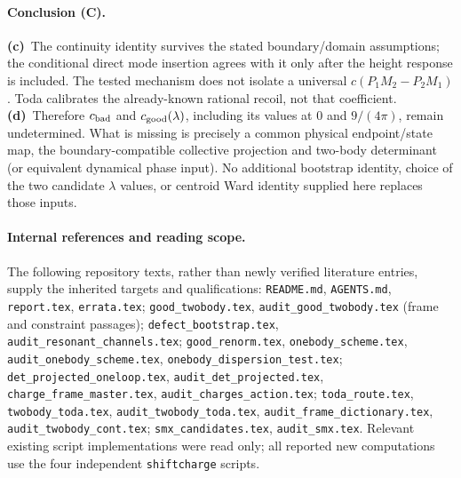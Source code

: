\documentclass[11pt,a4paper]{article}
\newcommand{\C}{\textbf{(c)}\ }
\newcommand{\D}{\textbf{(d)}\ }
\newcommand{\file}[1]{\nolinkurl{#1}}
\begin{document}
\paragraph{Conclusion (C).}
\C The continuity identity survives the stated boundary/domain assumptions;
the conditional direct mode insertion agrees with it only after the height
response is included. The tested mechanism does not isolate a universal
$c(P_1M_2-P_2M_1)$. Toda calibrates the already-known rational recoil,
not that coefficient. \D Therefore $c_{\rm bad}$ and
$c_{\rm good}(\lambda)$, including its values at $0$ and $9/(4\pi)$,
remain undetermined. What is missing is precisely a common physical
endpoint/state map, the boundary-compatible collective projection and
two-body determinant (or equivalent dynamical phase input). No additional
bootstrap identity, choice of the two candidate $\lambda$ values, or
centroid Ward identity supplied here replaces those inputs.

\paragraph{Internal references and reading scope.}
{\raggedright
The following repository texts, rather than newly verified literature
entries, supply the inherited targets and qualifications:
\file{README.md}, \file{AGENTS.md}, \file{report.tex}, \file{errata.tex};
\file{good_twobody.tex}, \file{audit_good_twobody.tex} (frame and constraint
passages); \file{defect_bootstrap.tex}, \file{audit_resonant_channels.tex};
\file{good_renorm.tex}, \file{onebody_scheme.tex},
\file{audit_onebody_scheme.tex}, \file{onebody_dispersion_test.tex};
\file{det_projected_oneloop.tex}, \file{audit_det_projected.tex},
\file{charge_frame_master.tex}, \file{audit_charges_action.tex};
\file{toda_route.tex}, \file{twobody_toda.tex},
\file{audit_twobody_toda.tex}, \file{audit_frame_dictionary.tex},
\file{audit_twobody_cont.tex}; \file{smx_candidates.tex}, \file{audit_smx.tex}.
Relevant existing script implementations were read only; all reported new
computations use the four independent \file{shiftcharge} scripts.\par}
\end{document}
